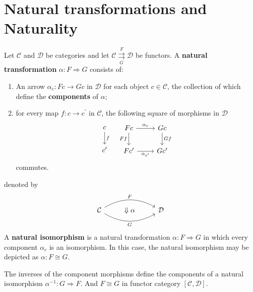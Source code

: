 \documentclass[12pt, oneside]{book}
\begin{document}
\section{Natural transformations and  Naturality} %

\begin{definition}
    Let $\mathcal{C}$ and $\mathcal{D}$ be categories and let $\mathcal{C} \underset{G}{\stackrel{F}{\rightrightarrows}} \mathcal{D}$ be functors. A \textbf{natural transformation} $\alpha: F \Rightarrow G$  consists of:
    \begin{enumerate}[label=(\roman*)]
        \item
              An arrow $\alpha_c : Fc \rightarrow Gc$ in $\mathcal{D}$ for each object $c\in \mathcal{C}$, the collection of which define the
              \textbf{components} of $\alpha$;
        \item
              for every map $f:c \rightarrow c^{\prime}$ in $\mathcal{C}$, the following square of morphisms in $\mathcal{D}$
              \begin{equation*}
                  \begin{tikzcd}
                      c\arrow[d,"f"]\\
                      c^\prime
                  \end{tikzcd}
                  \quad
                  \begin{tikzcd}
                      Fc \arrow[r, "\alpha_c"] \arrow[d, "Ff"'] & Gc \arrow[d, "Gf"] \\
                      Fc^{\prime} \arrow[r, "\alpha_{c^{\prime}}"'] & Gc^{\prime}
                  \end{tikzcd}
              \end{equation*}
              commutes.
    \end{enumerate}
    denoted by
    \begin{equation*}
        \begin{tikzcd}
            \mathcal{C} \arrow[rr, "G"', bend right] \arrow[rr, "F", bend left] & \Downarrow \alpha & \mathcal{D}
        \end{tikzcd}
    \end{equation*}
    A \textbf{natural isomorphism} is a natural transformation $\alpha: F \Rightarrow G$ in which every component $\alpha_c$ is an isomorphism. In this case, the natural isomorphism may be depicted as $\alpha: F \cong G$.
    \begin{remark}
        The inverses of the component morphisms define the components of a natural isomorphism $\alpha^{-1}: G \Rightarrow F$. And $F \cong G$ in functor category $[\mathcal{C},\mathcal{D}]$.
    \end{remark}
\end{definition}
\end{document}

